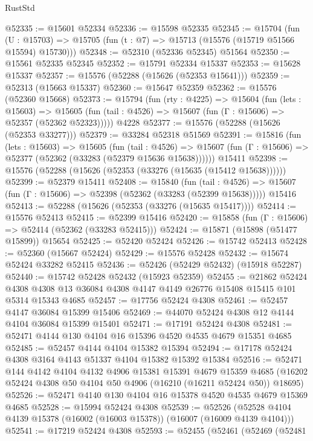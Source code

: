 \begin{lexlean}{RustStd}
\begin{coremodule}
@52335 := @15601 @52334
@52336 := @15598 @52335
@52345 := @15704
    (fun (U : @15703) => @15705 (fun (t : @7) => @15713 (@15576 (@15719 @51566 @15594) @15730)))
@52348 := @52310 (@52336 @52345) @51564
@52350 := @15561 @52335 @52345
@52352 := @15791 @52334 @15337
@52353 := @15628 @15337
@52357 := @15576 (@52288 (@15626 (@52353 @15641)))
@52359 := @52313 (@15663 @15337)
@52360 := @15647 @52359
@52362 := @15576 (@52360 @15668)
@52373 := @15794
    (fun (rty : @4225) =>
    @15604
      (fun (lets : @15603) =>
      @15605 (fun (tail : @4526) => @15607 (fun (Γ : @15606) => @52357 (@52362 @52323)))))
    @4228
@52377 := @15576 (@52288 (@15626 (@52353 @33277)))
@52379 := @33284 @52318 @51569
@52391 := @15816
    (fun (lets : @15603) =>
    @15605
      (fun (tail : @4526) =>
      @15607 (fun (Γ : @15606) => @52377 (@52362 (@33283 (@52379 @15636 @15638))))))
    @15411
@52398 := @15576 (@52288 (@15626 (@52353 (@33276 (@15635 (@15412 @15638))))))
@52399 := @52379 @15411
@52408 := @15840
    (fun (tail : @4526) => @15607 (fun (Γ : @15606) => @52398 (@52362 (@33283 (@52399 @15638)))))
    @15416
@52413 := @52288 (@15626 (@52353 (@33276 (@15635 @15417))))
@52414 := @15576 @52413
@52415 := @52399 @15416
@52420 := @15858 (fun (Γ : @15606) => @52414 (@52362 (@33283 @52415)))
@52424 := @15871 (@15898 (@51477 @15899)) @15654
@52425 := @52420 @52424
@52426 := @15742 @52413
@52428 := @52360 (@15667 @52424)
@52429 := @15576 @52428
@52432 := @15674 @52424 @33282 @52415
@52436 := @52426 (@52429 @52432) (@15918 @52287)
@52440 := @15742 @52428 @52432 (@15923 @52359)
@52455 := @21862
    @52424
    @4308
    @4308
    @13
    @36084
    @4308
    @4147
    @4149
    @26776
    @15408
    @15415
    @101
    @5314
    @15343
    @4685
@52457 := @17756 @52424 @4308
@52461 := @52457 @4147 @36084 @15399 @15406
@52469 := @44070 @52424 @4308 @12 @4144 @4104 @36084 @15399 @15401
@52471 := @17191 @52424 @4308
@52481 := @52471 @4144 @130 @4104 @16 @15396 @4520 @4535 @4679 @15351 @4685
@52485 := @52457 @4144 @4104 @15382 @15394
@52494 := @17178 @52424 @4308 @3164 @4143 @51337 @4104 @15382 @15392 @15384
@52516 := @52471
    @144
    @4142
    @4104
    @4132
    @4906
    @15381
    @15391
    @4679
    @15359
    @4685
    (@16202 @52424 @4308 @50 @4104 @50 @4906 (@16210 (@16211 @52424 @50)) @18695)
@52526 := @52471 @4140 @130 @4104 @16 @15378 @4520 @4535 @4679 @15369 @4685
@52528 := @15994 @52424 @4308
@52539 := @52526 (@52528 @4104 @4139 @15378 (@16002 (@16003 @15378)) (@16007 (@16009 @4139 @4104)))
@52541 := @17219 @52424 @4308
@52593 := @52455
    (@52461
      (@52469
        (@52481

\end{coremodule}
\end{lexlean}
